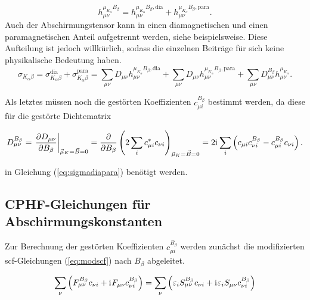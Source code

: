     \begin{equation}
     h_{\mu\nu}^{\mu_{K_\alpha}B_\beta}=h_{\mu\nu}^{\mu_{K_\alpha}B_\beta,\textrm{dia}}+h_{\mu\nu}^{\mu_{K_\alpha}B_\beta,\textrm{para}}.
	\end{equation}      
     Auch der Abschirmungstensor kann in einen diamagnetischen und einen paramagnetischen Anteil aufgetrennt werden, siehe beispielsweise\supercite{ditchfield1974self}. Diese Aufteilung ist jedoch willkürlich, sodass die einzelnen Beiträge für sich keine physikalische Bedeutung haben. 
     \begin{equation}\label{eq:sigmadiapara}
     \sigma_{K_\alpha\beta}=\sigma_{K_\alpha\beta}^{\textrm{dia}}+\sigma_{K_\alpha\beta}^{\textrm{para}}=\sum_{\mu\nu}D_{\mu\nu} h_{\mu\nu}^{\mu_{K_\alpha}B_\beta,\textrm{dia}} 
     +\sum_{\mu\nu}D_{\mu\nu} h_{\mu\nu}^{\mu_{K_\alpha}B_\beta,\textrm{para}} 
     +\sum_{\mu\nu}D_{\mu\nu}^{B_\beta} h_{\mu\nu}^{\mu_{K_\alpha}}.
     \end{equation}
     
     Als letztes müssen noch die gestörten Koeffizienten $c_{\mu i}^{B_\beta}$ bestimmt werden, da diese für die gestörte Dichtematrix 
     
     \begin{equation}\label{eq:dmunudb}
     D_{\mu\nu}^{B_\beta}=\left.\frac{\partial D_{\mu\nu}}{\partial B_\beta}\right\vert_{\vec{\mu}_K=\vec{B}=0}=\frac{\partial}{\partial B_\beta}\left(2\sum_i c_{\mu i}^*c_{\nu i}\right)_{\vec{\mu}_K=\vec{B}=0}=2\mathrm{i}\mkern1mu \sum_i\left(c_{\mu i}c_{\nu i}^{B_\beta}-c_{\mu i}^{B_\beta}c_{\nu i}\right).
     \end{equation}
     
     in Gleichung (\ref{eq:sigmadiapara}) benötigt werden.
     
\subsection{CPHF-Gleichungen für Abschirmungskonstanten}\label{kap:cphf}

     Zur Berechnung der gestörten Koeffizienten $c_{\mu i}^{B_\beta}$ werden zunächst die modifizierten \ac{scf}-Gleichungen (\ref{eq:modscf}) nach $B_\beta$ abgeleitet.
     
    \begin{equation}
	\sum_{\nu}\left(F_{\mu\nu}^{B_\beta}c_{\nu i}+\mathrm{i}\mkern1mu F_{\mu\nu}c_{\nu i}^{B_\beta}\right)=\sum_{\nu}\left(\varepsilon_i S_{\mu\nu}^{B_\beta}c_{\nu i}+\mathrm{i}\mkern1mu\varepsilon_i S_{\mu\nu}c_{\nu i}^{B_\beta}\right)
	\end{equation}
     
